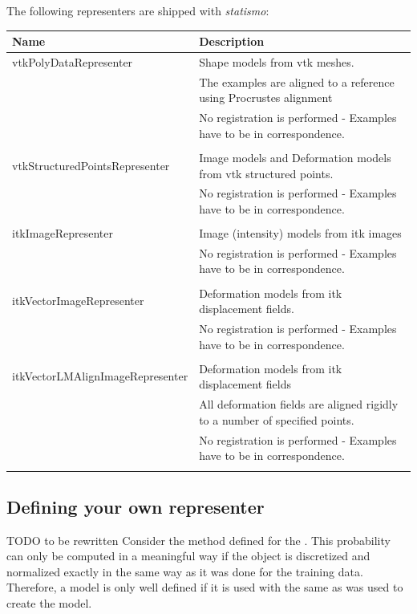\documentclass{InsightArticle}
\newcommand{\statismo}{\emph{statismo}\xspace}
\begin{document}
The following representers are shipped with \statismo:

\begin{tabular}{ll}
  Name & Description \\ \hline 
  vtkPolyDataRepresenter & Shape models from vtk meshes.  \\
  & The examples are aligned to a reference using Procrustes alignment \\
  & No registration is performed - Examples have to be in correspondence. \\ \\
  vtkStructuredPointsRepresenter & Image models and Deformation models from vtk structured points.\\
  & No registration is performed - Examples have to be in correspondence. \\ \\
  itkImageRepresenter & Image (intensity) models from itk images \\
  & No registration is performed - Examples have to be in correspondence. \\ \\
  itkVectorImageRepresenter & Deformation models from itk displacement fields. \\
  & No registration is performed - Examples have to be in correspondence. \\ \\
  itkVectorLMAlignImageRepresenter & Deformation models from itk displacement fields \\
  & All deformation fields are aligned rigidly to a number of specified points. \\
  & No registration is performed - Examples have to be in correspondence. \\ \\

\end{tabular}
\subsection{Defining your own representer}
TODO to be rewritten
Consider the method
 defined for the . This probability 
can only be computed in a meaningful way if the object is discretized and normalized exactly in the same way 
as it was done for the training data. Therefore, a model is only well defined if it is used with the same  as was used to create the model.
\end{document}
